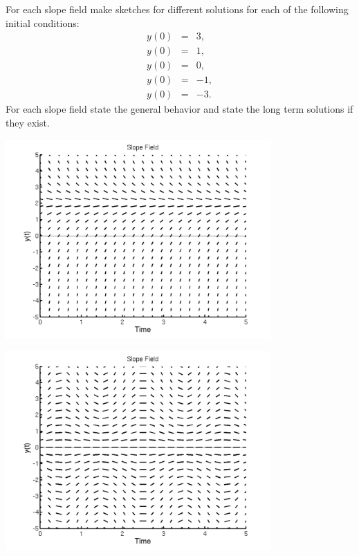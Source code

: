 \begin{problem}
\begin{subproblem}
{      }

      \vfill
  \end{subproblem}

\clearpage

\item For each slope field make sketches for different solutions for
  each of the following initial conditions:
  \begin{eqnarray*}
    y(0) & = & 3, \\
    y(0) & = & 1, \\
    y(0) & = & 0, \\
    y(0) & = & -1, \\
    y(0) & = & -3.
  \end{eqnarray*}
  For each slope field state the general behavior and state the long
  term solutions if they exist.

  \begin{subproblem}
    \item \includegraphics[height=3.0in]{img/sfSteadyWk1}
    \item \includegraphics[height=3.0in]{img/sfOscillateWk1}


\end{subproblem}
\end{problem}
